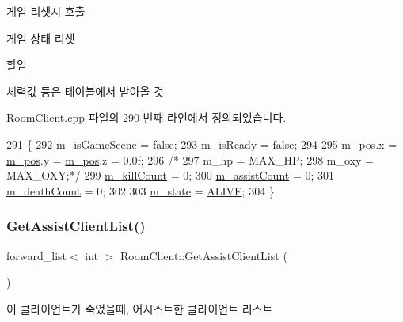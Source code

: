 게임 리셋시 호출 

게임 상태 리셋

\begin{DoxyRefDesc}{할일}
\item[\hyperlink{todo__todo000001}{할일}]체력값 등은 테이블에서 받아올 것 \end{DoxyRefDesc}


Room\+Client.\+cpp 파일의 290 번째 라인에서 정의되었습니다.


\begin{DoxyCode}
291 \{
292     \hyperlink{class_room_client_a491106d1b6fbf97fd76a7d1449bf5de9}{m\_isGameScene} = \textcolor{keyword}{false};
293     \hyperlink{class_room_client_a09fb4ef6ca643e53d68ad771761e8289}{m\_isReady} = \textcolor{keyword}{false};
294 
295     \hyperlink{class_room_client_a7000a6db44ab9d2f646d625d33c8d8b7}{m\_pos}.x = \hyperlink{class_room_client_a7000a6db44ab9d2f646d625d33c8d8b7}{m\_pos}.y = \hyperlink{class_room_client_a7000a6db44ab9d2f646d625d33c8d8b7}{m\_pos}.z = 0.0f;
296 \textcolor{comment}{/*}
297 \textcolor{comment}{    m\_hp = MAX\_HP;}
298 \textcolor{comment}{    m\_oxy = MAX\_OXY;*/}
299     \hyperlink{class_room_client_a221340e3b573d5b8e3c09fcc16bbb01b}{m\_killCount} = 0;
300     \hyperlink{class_room_client_adacb97c1fec85cb0efef063dc43073f5}{m\_assistCount} = 0;
301     \hyperlink{class_room_client_a4427d3725926876237d44ae4b088c57f}{m\_deathCount} = 0;
302 
303     \hyperlink{class_room_client_a247e5deb46a11e0d1a0e8e9029d87d54}{m\_state} = \hyperlink{stdafx_8h_a3c730f37b1b3a893159bada67637fdb1a4f34c5c191d6e0d028ca831b6c0b1571}{ALIVE};
304 \}
\end{DoxyCode}
\mbox{\label{class_room_client_a77d6732bdd92fd7222949f8408a1a4d4}} 
\subsubsection{\texorpdfstring{Get\+Assist\+Client\+List()}{GetAssistClientList()}}
{\footnotesize\ttfamily forward\+\_\+list$<$ int $>$ Room\+Client\+::\+Get\+Assist\+Client\+List (\begin{DoxyParamCaption}{ }\end{DoxyParamCaption})}



이 클라이언트가 죽었을때, 어시스트한 클라이언트 리스트 

